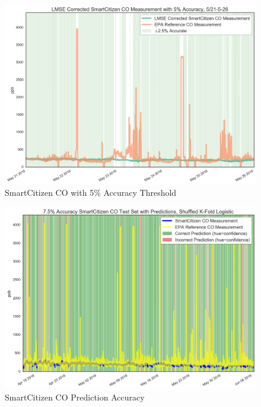 \begin{figure}[htb]
 	\includegraphics[width=\textwidth]{figs/sck_co_with_5_accuracy_zoomed}               
 	 \caption{SmartCitizen CO with 5\% Accuracy Threshold}
  	\label{fig:sck_co_with_5_accuracy_zoomed}
\end{figure}

\begin{figure}[htb]
 	\includegraphics[width=\textwidth]{figs/sck_co_7p5_logistic_predictions}               
 	 \caption{SmartCitizen CO Prediction Accuracy}
  	\label{fig:sck_co_7p5_logistic_predictions}
\end{figure}

